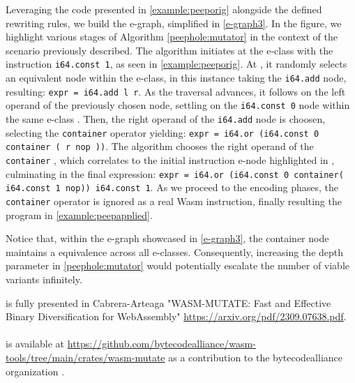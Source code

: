 Leveraging the code presented in \autoref{example:peeporig} alongside the defined rewriting rules, we build the e-graph, simplified in \autoref{e-graph3}.
In the figure, we highlight various stages of Algorithm \ref{peephole:mutator} in the context of the scenario previously described. 
The algorithm initiates at the e-class with the instruction \texttt{i64.const 1}, as seen in \autoref{example:peeporig}.
At , it randomly selects an equivalent node within the e-class, in this instance taking the \texttt{i64.add} node, resulting: {\texttt{expr = i64.add l r}}.
As the traversal advances, it follows on the left operand of the previously chosen node, settling on the \texttt{i64.const 0} node within the same e-class .
Then, the right operand of the \texttt{i64.add} node is choosen, selecting the \texttt{container}  operator yielding:
{\texttt{expr = i64.or (i64.const 0 container ( r nop ))}}.
The algorithm chooses the right operand of the \texttt{container} , which correlates to the initial instruction e-node highlighted in , culminating in the final expression:
{\texttt{expr = i64.or (i64.const 0 container( i64.const 1 nop))\ i64.const 1}}.
As we proceed to the encoding phases, the \texttt{container} operator is ignored as a real Wasm instruction, finally resulting the program in \autoref{example:peepapplied}.

Notice that, within the e-graph showcased in \autoref{e-graph3}, the container node maintains a equivalence across all e-classes. 
Consequently, increasing the depth parameter in \autoref{peephole:mutator} would potentially escalate the number of viable variants infinitely.



\begin{tcolorbox}[title=Contribution paper and artifact,boxrule=1pt,arc=.2em,boxsep=1.0mm]
  \tool is fully presented in Cabrera-Arteaga \etal "WASM-MUTATE: Fast and Effective Binary Diversification for WebAssembly"
 \url{https://arxiv.org/pdf/2309.07638.pdf}.
  \\\\
  \tool is available at \url{https://github.com/bytecodealliance/wasm-tools/tree/main/crates/wasm-mutate} as a contribution to the bytecodealliance organization \cite{bytecode}.
\end{tcolorbox}
